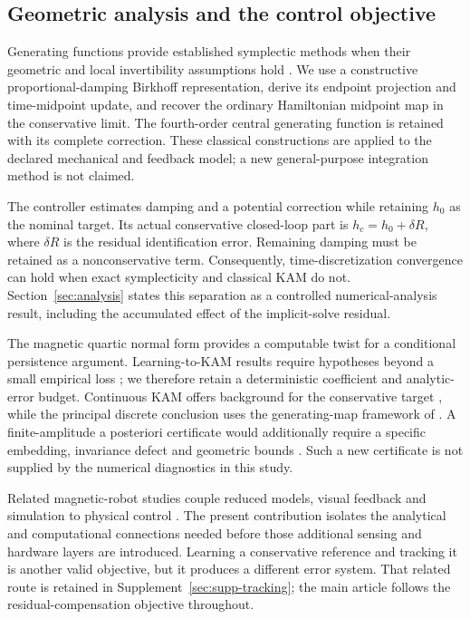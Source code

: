 \subsection{Geometric analysis and the control objective}
Generating functions provide established symplectic methods when their geometric and local invertibility assumptions hold \citep{feng,fengqin,hairer}. We use a constructive proportional-damping Birkhoff representation, derive its endpoint projection and time-midpoint update, and recover the ordinary Hamiltonian midpoint map in the conservative limit. The fourth-order central generating function is retained with its complete correction. These classical constructions are applied to the declared mechanical and feedback model; a new general-purpose integration method is not claimed.

The controller estimates damping and a potential correction while retaining $h_0$ as the nominal target. Its actual conservative closed-loop part is $h_c=h_0+\delta R$, where $\delta R$ is the residual identification error. Remaining damping must be retained as a nonconservative term. Consequently, time-discretization convergence can hold when exact symplecticity and classical KAM do not. Section~\ref{sec:analysis} states this separation as a controlled numerical-analysis result, including the accumulated effect of the implicit-solve residual.

The magnetic quartic normal form provides a computable twist for a conditional persistence argument. Learning-to-KAM results require hypotheses beyond a small empirical loss \citep{chen2022}; we therefore retain a deterministic coefficient and analytic-error budget. Continuous KAM offers background for the conservative target \citep{poschel}, while the principal discrete conclusion uses the generating-map framework of \citet{shang}. A finite-amplitude a posteriori certificate would additionally require a specific embedding, invariance defect and geometric bounds \citep{haro2019aposteriori}. Such a new certificate is not supplied by the numerical diagnostics in this study.

Related magnetic-robot studies couple reduced models, visual feedback and simulation to physical control \citep{francescon2025shape,tong2025navigation}. The present contribution isolates the analytical and computational connections needed before those additional sensing and hardware layers are introduced. Learning a conservative reference and tracking it is another valid objective, but it produces a different error system. That related route is retained in Supplement~\ref{sec:supp-tracking}; the main article follows the residual-compensation objective throughout.

